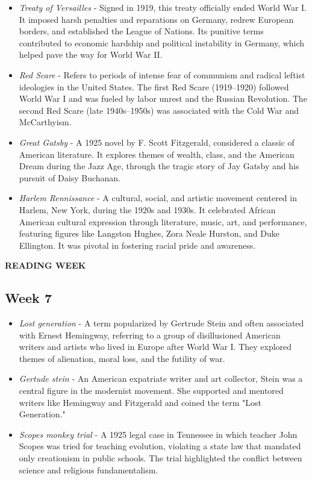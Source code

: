 \documentclass[12pt]{article}
\begin{document}
\begin{itemize}
    \item \textit{Treaty of Versailles} - Signed in 1919, this treaty officially ended World War I. It imposed harsh penalties and reparations on Germany, redrew European borders, and established the League of Nations. Its punitive terms contributed to economic hardship and political instability in Germany, which helped pave the way for World War II.
    
    \item \textit{Red Scare} - Refers to periods of intense fear of communism and radical leftist ideologies in the United States. The first Red Scare (1919–1920) followed World War I and was fueled by labor unrest and the Russian Revolution. The second Red Scare (late 1940s–1950s) was associated with the Cold War and McCarthyism.
    
    \item \textit{Great Gatsby} - A 1925 novel by F. Scott Fitzgerald, considered a classic of American literature. It explores themes of wealth, class, and the American Dream during the Jazz Age, through the tragic story of Jay Gatsby and his pursuit of Daisy Buchanan.
    
    \item \textit{Harlem Rennissance} - A cultural, social, and artistic movement centered in Harlem, New York, during the 1920s and 1930s. It celebrated African American cultural expression through literature, music, art, and performance, featuring figures like Langston Hughes, Zora Neale Hurston, and Duke Ellington. It was pivotal in fostering racial pride and awareness.

\end{itemize}

\centerline{\textbf{READING WEEK}}
\hrulefill

\subsection*{Week 7}

\begin{itemize}
    \item\textit{Lost generation} - A term popularized by Gertrude Stein and often associated with Ernest Hemingway, referring to a group of disillusioned American writers and artists who lived in Europe after World War I. They explored themes of alienation, moral loss, and the futility of war.

    \item\textit{Gertude stein} - An American expatriate writer and art collector, Stein was a central figure in the modernist movement. She supported and mentored writers like Hemingway and Fitzgerald and coined the term "Lost Generation."
    
    \item\textit{Scopes monkey trial} - A 1925 legal case in Tennessee in which teacher John Scopes was tried for teaching evolution, violating a state law that mandated only creationism in public schools. The trial highlighted the conflict between science and religious fundamentalism.
\end{itemize}
\end{document}
